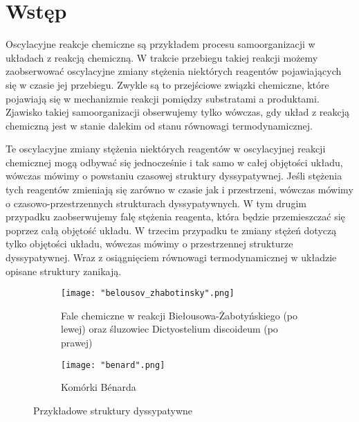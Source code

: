 \documentclass[10pt, a4paper, twoside, onecolumn]{article}
\numberwithin{equation}{section}
\begin{document}
	\section{Wstęp}
	
	Oscylacyjne reakcje chemiczne są przykładem procesu samoorganizacji w układach z reakcją chemiczną. W trakcie przebiegu takiej reakcji możemy zaobserwować oscylacyjne zmiany stężenia niektórych reagentów pojawiających się w czasie jej przebiegu. Zwykle są to przejściowe związki chemiczne, które pojawiają się w mechanizmie reakcji pomiędzy substratami a produktami. Zjawisko takiej samoorganizacji obserwujemy tylko wówczas, gdy układ z reakcją chemiczną jest w stanie dalekim od stanu równowagi termodynamicznej. \par
	Te oscylacyjne zmiany stężenia niektórych reagentów w oscylacyjnej reakcji chemicznej mogą odbywać się jednocześnie i tak samo w całej objętości układu, wówczas mówimy o powstaniu czasowej struktury dyssypatywnej. Jeśli stężenia tych reagentów zmieniają się zarówno w czasie jak i przestrzeni, wówczas mówimy o czasowo-przestrzennych strukturach dyssypatywnych. W tym drugim przypadku zaobserwujemy falę stężenia reagenta, która będzie przemieszczać się poprzez całą objętość układu. W trzecim przypadku te zmiany stężeń dotyczą tylko objętości układu, wówczas mówimy o przestrzennej strukturze dyssypatywnej. Wraz z osiągnięciem równowagi termodynamicznej w układzie opisane struktury zanikają. 
	
	\begin{figure}[H]
		\centering
		\begin{subfigure}{0.45\textwidth}
			\centering
			\texttt{[image: "belousov\_zhabotinsky".png]}
			\caption{Fale chemiczne w reakcji Biełousowa-Żabotyńskiego (po lewej) oraz śluzowiec Dictyostelium discoideum (po prawej) \cite{epstein}}
			\label{fig:bz_disco}
		\end{subfigure}
		\begin{subfigure}{0.45\textwidth}
			\centering
			\texttt{[image: "benard".png]}
			\caption{Komórki B\'{e}narda \cite{prigogine}}
			\label{fig:benard}
		\end{subfigure}
		\caption{Przykładowe struktury dyssypatywne}
		\label{fig:struktury_dyssypatywne}
	\end{figure}
	
\end{document}
